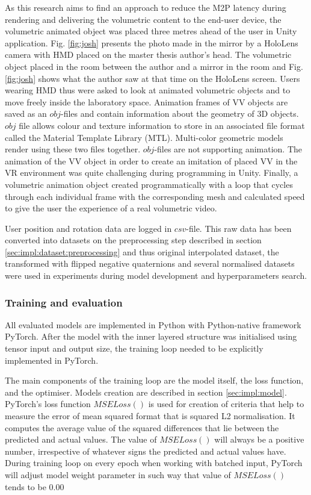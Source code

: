 As this research aims to find an approach to reduce the M2P latency during rendering and delivering the volumetric content to the end-user device, the volumetric animated object was placed three metres ahead of the user in Unity application. Fig. \ref{fig:josh} presents the photo made in the mirror by a HoloLens camera with HMD placed on the master thesis author's head. The volumetric object placed in the room between the author and a mirror in the room and Fig. \ref{fig:josh} shows what the author saw at that time on the HoloLens screen. Users wearing HMD thus were asked to look at animated volumetric objects and to move freely inside the laboratory space. Animation frames of VV objects are saved as an $obj$-files and contain information about the geometry of 3D objects. $obj$ file allows colour and texture information to store in an associated file format called the Material Template Library (MTL). Multi-color geometric models render using these two files together. $obj$-files are not supporting animation. The animation of the VV object in order to create an imitation of placed VV in the VR environment was quite challenging during programming in Unity. Finally, a volumetric animation object created programmatically with a loop that cycles through each individual frame with the corresponding mesh and calculated speed to give the user the experience of a real volumetric video.

User position and rotation data are logged in $csv$-file. This raw data has been converted into datasets on the preprocessing step described in section \ref{sec:impl:dataset:preprocessing} and thus original interpolated dataset, the transformed with flipped negative quaternions and several normalised datasets were used in experiments during model development and hyperparameters search.


\subsubsection{Training and evaluation}
\label{sec:impl:model:dev:programming}
All evaluated models are implemented in Python with Python-native framework PyTorch. After the model with the inner layered structure was initialised using tensor input and output size, the training loop needed to be explicitly implemented in PyTorch. 

The main components of the training loop are the model itself, the loss function, and the optimiser. Models creation are described in section \ref{sec:impl:model}. PyTorch's loss function $MSELoss()$ is used for creation of criteria that help to measure the error of mean squared format that is squared L2 normalisation. It computes the average value of the squared differences that lie between the predicted and actual values. The value of $MSELoss()$ will always be a positive number, irrespective of whatever signs the predicted and actual values have. During training loop on every epoch when working with batched input, PyTorch will adjust model weight parameter in such way that value of $MSELoss()$ tends to be 0.00

